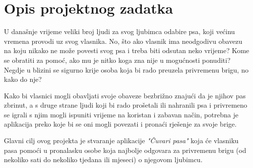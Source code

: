 \chapter{Opis projektnog zadatka}
		
		
		
		
		U današnje vrijeme veliki broj ljudi za svog ljubimca odabire psa, koji većinu vremena provodi uz svog vlasnika. No, što ako vlasnik ima neodgodivu obavezu na koju nikako ne može povesti svog psa i treba biti odsutan neko vrijeme? Kome se obratiti za pomoć, ako mu je nitko koga zna nije u mogućnosti ponuditi? Negdje u blizini se sigurno krije osoba koja bi rado preuzela privremenu brigu, no kako do nje? 
		
		Kako bi vlasnici mogli obavljati svoje obaveze bezbrižno znajući da je njihov pas zbrinut, a s druge strane ljudi koji bi rado prošetali ili nahranili psa i privremeno se igrali s njim mogli ispuniti vrijeme na koristan i zabavan način, potrebna je aplikacija preko koje bi se oni mogli povezati i pronaći rješenje za svoje brige. 
		
		Glavni cilj ovog projekta je stvaranje aplikacije \textit{"Čuvari pasa"} koja će vlasniku pasa pomoći u pronalasku osobe koja najbolje odgovara za privremenu brigu (od nekoliko sati do nekoliko tjedana ili mjeseci) o njegovom ljubimcu. 
		
